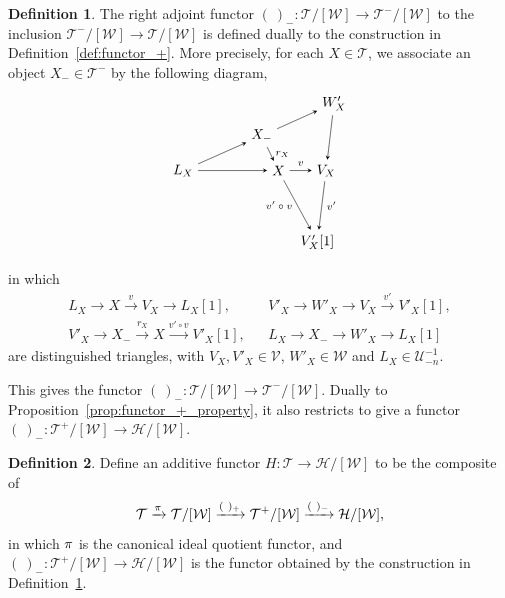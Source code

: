 \documentclass[a4paper,reqno,10pt]{amsart}
\theoremstyle{definition}
\newtheorem{definition}[definition]{Definition}
\theoremstyle{definition}
\theoremstyle{definition}
\theoremstyle{definition}
\theoremstyle{plain}
\newcommand{\CH}{\mathcal{H}}
\newcommand{\CT}{\mathcal{T}}
\newcommand{\CU}{\mathcal{U}}
\newcommand{\CV}{\mathcal{V}}
\newcommand{\CW}{\mathcal{W}}
\begin{document}
\begin{definition}\label{def:functor_-}
\color{blue}
The right adjoint functor $(\ )_-\colon\CT/[\CW]\to\CT^-/[\CW]$ to the inclusion $\CT^-/[\CW]\to\CT/[\CW]$ is defined dually to the construction in Definition~\ref{def:functor_+}. More precisely, for each $X\in\CT$, we associate an object $X_-\in\CT^-$ by the following diagram,
\normalcolor
\[
\begin{tikzpicture}[>=stealth]
\node (1) at (-2.4,0) {$L_X$};
\node (2) at (-0.42,0.88) {$X_-$};
\node (3) at (1.4,1.7) {$W'_X$};
\node (4) at (0,0) {$X$};
\node (5) at (1.2,0) {$V_X$};
\node (6) at (0.98,-1.8) {$V'_X[1]$};
\draw[->] (1) -- (2);
\draw[->] (1) -- (4);
\draw[->] (2) -- (3);
\draw[->] (2) -- node[right,font=\scriptsize] {$r_X$} (4);
\draw[->] (3) -- (5);
\draw[->] (4) -- node[above,font=\scriptsize] {$v$} (5);
\draw[->] (4) -- node[left,font=\scriptsize] {$v'\circ v$} (6);
\draw[->] (5) -- node[right,font=\scriptsize] {$v'$} (6);
\end{tikzpicture}
\]
in which
\begin{eqnarray*}
L_X\to X\xrightarrow{v}V_X\to L_X[1], && V'_X\to W'_X\to V_X\xrightarrow{v'}V'_X[1],\\
V'_X\to X_-\xrightarrow{r_X}X\xrightarrow{v'\circ v}V'_X[1], && L_X\to X_-\to W'_X\to L_X[1]
\end{eqnarray*}
are distinguished triangles, with $V_X,V'_X\in\CV$, $W'_X\in\CW$ and $L_X\in\CU_{-n}^{-1}$.

This gives the functor $(\ )_-\colon\CT/[\CW]\to\CT^-/[\CW]$. Dually to Proposition~\ref{prop:functor_+_property}, it also restricts to give a functor $(\ )_-\colon\CT^+/[\CW]\to\CH/[\CW]$.
\end{definition}


\begin{definition}\label{def:functor_H}
Define an additive functor $H\colon\CT\to\CH/[\CW]$ to be the composite of
\[
\CT\xrightarrow{\textcolor{blue}{\pi}}\CT/[\CW]\xrightarrow{(\ )_+}\CT^+/[\CW]\xrightarrow{(\ )_-}\CH/[\CW],
\]
in which $\textcolor{blue}{\pi}$ is the canonical ideal quotient functor, and $(\ )_-\colon\CT^+/[\CW]\to\CH/[\CW]$ is the functor obtained by the construction in Definition~\ref{def:functor_-}.
\end{definition}
\end{document}
